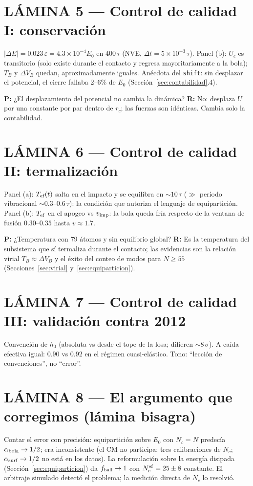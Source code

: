 \documentclass[11pt,a4paper]{article}
\newcommand{\eps}{\varepsilon}
\begin{document}
\section*{LÁMINA 5 --- Control de calidad I: conservación}
$|\Delta E| = 0.023\,\eps = 4.3\times10^{-4}E_0$ en $400\,\tau$ (NVE,
$\Delta t = 5\times10^{-3}\,\tau$). Panel (b): $U_c$ es transitorio (solo
existe durante el contacto y regresa mayoritariamente a la bola); $T_B$ y
$\Delta V_B$ quedan, aproximadamente iguales. Anécdota del \texttt{shift}:
sin desplazar el potencial, el cierre fallaba 2--6\% de $E_0$
(Sección~\ref{sec:contabilidad}.4).

\textbf{P:} ¿El desplazamiento del potencial no cambia la dinámica?
\textbf{R:} No: desplaza $U$ por una constante por par dentro de $r_c$; las
fuerzas son idénticas. Cambia solo la contabilidad.

\section*{LÁMINA 6 --- Control de calidad II: termalización}
Panel (a): $T_{\rm ef}(t)$ salta en el impacto y se equilibra en
$\sim10\,\tau$ ($\gg$ período vibracional $\sim0.3$--$0.6\,\tau$): la
condición que autoriza el lenguaje de equipartición. Panel (b):
$T_{\rm ef}$ en el apogeo vs $v_{\rm imp}$: la bola queda fría respecto de
la ventana de fusión $0.30$--$0.35$ hasta $v\approx1.7$.

\textbf{P:} ¿Temperatura con 79 átomos y sin equilibrio global? \textbf{R:}
Es la temperatura del subsistema que sí termaliza durante el contacto; las
evidencias son la relación virial $T_B\approx\Delta V_B$ y el éxito del
conteo de modos para $N\ge55$ (Secciones~\ref{sec:virial}
y~\ref{sec:equiparticion}).

\section*{LÁMINA 7 --- Control de calidad III: validación contra 2012}
Convención de $h_0$ (absoluta vs desde el tope de la losa; difieren
$\sim8\,\sigma$). A caída efectiva igual: $0.90$ vs $0.92$ en el régimen
cuasi-elástico. Tono: ``lección de convenciones'', no ``error''.

\section*{LÁMINA 8 --- El argumento que corregimos (lámina bisagra)}
Contar el error con precisión: equipartición sobre $E_0$ con $N_c=N$
predecía $\alpha_{\rm bola}\to1/2$; era inconsistente (el CM no participa;
tres calibraciones de $N_c$; $\alpha_{\rm surf}\to1/2$ no está en los
datos). La reformulación sobre la energía disipada
(Sección~\ref{sec:equiparticion}) da $f_{\rm ball}\to1$ con
$N_c^{\rm ef}=25\pm8$ constante. El arbitraje simulado detectó el problema;
la medición directa de $N_c$ lo resolvió.
\end{document}
